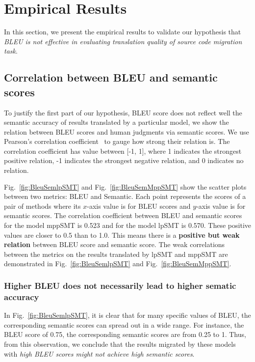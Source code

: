 \section{Empirical Results}
\label{sec:bleuresult}

In this section, we present the empirical results to validate our hypothesis that
\textit{BLEU is not effective in evaluating translation quality of source code migration task}.
\subsection{Correlation between BLEU and semantic scores}
To justify the first part of our hypothesis, BLEU score does not reflect well
the semantic accuracy of results translated by a particular model,
we show the relation between BLEU scores and human judgments via semantic scores.
We use Pearson's correlation coefficient~\cite{PearsonCorrelation} to gauge
how strong their relation is. The correlation coefficient has value
between [-1, 1], where 1 indicates the strongest positive relation, -1
indicates the strongest negative relation, and 0 indicates no relation.

Fig.~\ref{fig:BleuSemlpSMT} and Fig.~\ref{fig:BleuSemMppSMT} show the
scatter plots between two metrics: BLEU and Semantic. Each point
represents the scores of a pair of methods where its $x$-axis value is
for BLEU scores and $y$-axis value is for semantic scores. The
correlation coefficient between BLEU and semantic scores for the model
mppSMT is 0.523 and for the model lpSMT is 0.570. These positive values
are closer to 0.5 than to 1.0. This means there is a {\bf positive but weak
relation} between BLEU score and semantic score. The weak correlations %
between the metrics on the results translated by lpSMT and mppSMT are
demonstrated in Fig.~\ref{fig:BleuSemlpSMT} and Fig.~\ref{fig:BleuSemMppSMT}.


\subsubsection{{\bf Higher BLEU does not necessarily lead to higher
sematic accuracy}}

In Fig.~\ref{fig:BleuSemlpSMT}, it is clear that for many specific
values of BLEU, the corresponding semantic scores can spread out in a
wide range. For instance, the BLEU score of 0.75, the corresponding
semantic scores are from 0.25 to 1.
Thus, from this observation, we conclude that the results migrated by
these models with {\em high BLEU scores might not achieve high semantic
scores}.
%

